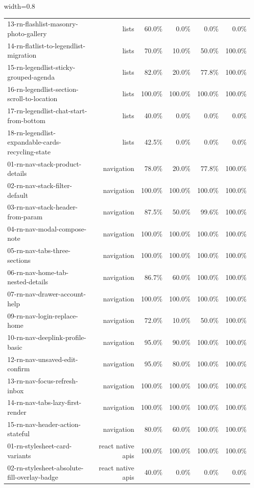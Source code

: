 \begin{table}[htbp]
\begin{adjustbox}{width=0.8\textwidth}
\begin{tabular}{lrrrrr}
13-rn-flashlist-masonry-photo-gallery & lists & 60.0\% & 0.0\% & 0.0\% & 0.0\% \\
14-rn-flatlist-to-legendlist-migration & lists & 70.0\% & 10.0\% & 50.0\% & 100.0\% \\
15-rn-legendlist-sticky-grouped-agenda & lists & 82.0\% & 20.0\% & 77.8\% & 100.0\% \\
16-rn-legendlist-section-scroll-to-location & lists & 100.0\% & 100.0\% & 100.0\% & 100.0\% \\
17-rn-legendlist-chat-start-from-bottom & lists & 40.0\% & 0.0\% & 0.0\% & 0.0\% \\
18-rn-legendlist-expandable-cards-recycling-state & lists & 42.5\% & 0.0\% & 0.0\% & 0.0\% \\
01-rn-nav-stack-product-details & navigation & 78.0\% & 20.0\% & 77.8\% & 100.0\% \\
02-rn-nav-stack-filter-default & navigation & 100.0\% & 100.0\% & 100.0\% & 100.0\% \\
03-rn-nav-stack-header-from-param & navigation & 87.5\% & 50.0\% & 99.6\% & 100.0\% \\
04-rn-nav-modal-compose-note & navigation & 100.0\% & 100.0\% & 100.0\% & 100.0\% \\
05-rn-nav-tabs-three-sections & navigation & 100.0\% & 100.0\% & 100.0\% & 100.0\% \\
06-rn-nav-home-tab-nested-details & navigation & 86.7\% & 60.0\% & 100.0\% & 100.0\% \\
07-rn-nav-drawer-account-help & navigation & 100.0\% & 100.0\% & 100.0\% & 100.0\% \\
09-rn-nav-login-replace-home & navigation & 72.0\% & 10.0\% & 50.0\% & 100.0\% \\
10-rn-nav-deeplink-profile-basic & navigation & 95.0\% & 90.0\% & 100.0\% & 100.0\% \\
12-rn-nav-unsaved-edit-confirm & navigation & 95.0\% & 80.0\% & 100.0\% & 100.0\% \\
13-rn-nav-focus-refresh-inbox & navigation & 100.0\% & 100.0\% & 100.0\% & 100.0\% \\
14-rn-nav-tabs-lazy-first-render & navigation & 100.0\% & 100.0\% & 100.0\% & 100.0\% \\
15-rn-nav-header-action-stateful & navigation & 80.0\% & 60.0\% & 100.0\% & 100.0\% \\
01-rn-stylesheet-card-variants & react native apis & 100.0\% & 100.0\% & 100.0\% & 100.0\% \\
02-rn-stylesheet-absolute-fill-overlay-badge & react native apis & 40.0\% & 0.0\% & 0.0\% & 0.0\% \\

\end{tabular}
\end{adjustbox}
\end{table}
